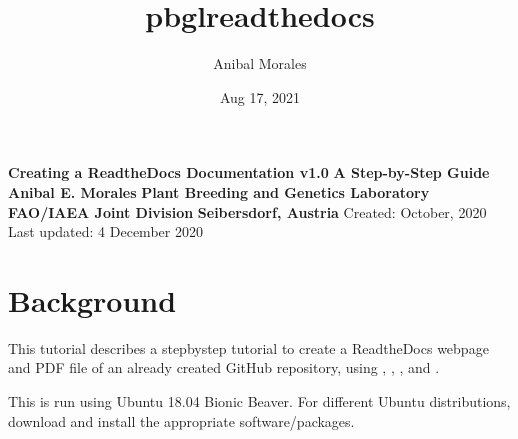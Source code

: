 \documentclass[letterpaper,10pt,english]{sphinxhowto}
\title{pbgl\sphinxhyphen{}read\sphinxhyphen{}the\sphinxhyphen{}docs}
\date{Aug 17, 2021}
\author{Anibal Morales}
\begin{document}
\pagestyle{empty}

        \begin{titlepage}
            \vspace*{10mm} %
            \flushright\textbf{\Huge {Creating a ReadtheDocs Documentation v1.0}}
            \vspace{0mm} %
            \textbf{\Large {A Step-by-Step Guide}}
            \vspace{50mm} %
            \textbf{\Large {Anibal E. Morales}}
            \vspace{10mm} %
            \textbf{\Large {Plant Breeding and Genetics Laboratory}}
            \vspace{0mm} %
            \textbf{\Large {FAO/IAEA Joint Division}}
            \vspace{0mm} %
            \textbf{\Large {Seibersdorf, Austria}}
            \vspace{10mm} %
            \normalsize Created: October, 2020
            \vspace*{0mm} %
            \normalsize  Last updated: 4 December 2020
            \vfill
            \small{}
        \end{titlepage}
        \newcommand{\sectionbreak}{\clearpage}

\pagestyle{plain}
\sphinxtableofcontents
\pagestyle{normal}
\label{\detokenize{index::doc}}



\section{Background}
\label{\detokenize{index:background}}
\sphinxAtStartPar
This tutorial describes a step\sphinxhyphen{}by\sphinxhyphen{}step tutorial to create a ReadtheDocs webpage and PDF file of an already created GitHub repository, using , , , and .

\sphinxAtStartPar
This is run using Ubuntu 18.04 Bionic Beaver. For different Ubuntu distributions, download and install the appropriate software/packages.
\end{document}
